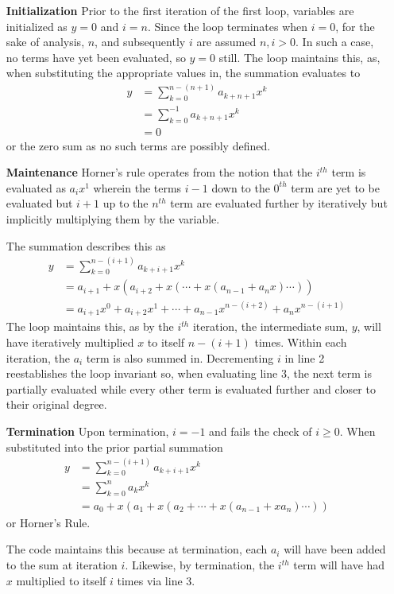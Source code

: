 \documentclass[a4paper,11pt]{article}
\theoremstyle{mytheor}
\begin{document}
\begin{itemize}
    \item[\textbf{Initialization}] Prior to the first iteration of the first loop,
    variables are initialized as $y=0$ and $i=n$. Since the loop terminates when
    $i=0$, for the sake of analysis, $n$, and subsequently $i$ are assumed $n,i >
    0$. In such a case, no terms have yet been evaluated, so $y=0$ still. The
    loop maintains this, as, when substituting the appropriate values in, the
    summation evaluates to 
    \begin{align}
        y & = \sum_{k=0}^{n-(n+1)} a_{k+n+1} x^{k} \\
          & = \sum_{k=0}^{-1} a_{k+n+1} x^{k} \\
          & = 0
    \end{align}
    or the zero sum as no such terms are possibly defined. 

    \item[\textbf{Maintenance}] Horner's rule operates from the notion that the 
    $i^{th}$ term is evaluated as $a_i x^1$ wherein the terms $i-1$ down to the
    $0^{th}$ term are yet to be evaluated but $i+1$ up to the $n^{th}$ term are
    evaluated further by iteratively but implicitly multiplying them by the 
    variable.
    
    The summation describes this as
    \begin{align}
        y & = \sum_{k=0}^{n-(i+1)} a_{k+i+1} x^k \\
          & = a_{i+1} + x(a_{i+2} + x( \cdots + x(a_{n-1} + a_n x)\cdots )) \\
          & = a_{i+1} x^{0} + a_{i+2} x^{1} + \cdots + a_{n-1} x^{n-(i+2)}
                   + a_n x^{n-(i+1)}
    \end{align}
    The loop maintains this, as by the $i^{th}$ iteration, the intermediate sum,
    $y$, will have iteratively multiplied $x$ to itself $n-(i+1)$ times. Within
    each iteration, the $a_{i}$ term is also summed in. Decrementing $i$ in line
    2 reestablishes the loop invariant so, when evaluating line 3, the next term
    is partially evaluated while every other term is evaluated further and 
    closer to their original degree.
    
    \item[\textbf{Termination}] Upon termination, $i=-1$ and fails the check of 
    $i \ge 0$. When substituted into the prior partial summation
    \begin{align}
        y & = \sum_{k=0}^{n-(i+1)} a_{k+i+1} x^k \\
          & = \sum_{k=0}^{n} a_{k} x^k \\
          & = a_0 + x(a_1 + x(a_2 + \cdots  + x(a_{n-1} + xa_n) \cdots ))
    \end{align}
    or Horner's Rule. 
    
    The code maintains this because at termination, each $a_i$ will have been
    added to the sum at iteration $i$. Likewise, by termination, the $i^{th}$
    term will have had $x$ multiplied to itself $i$ times via line 3. 
\end{itemize}
\end{document}
